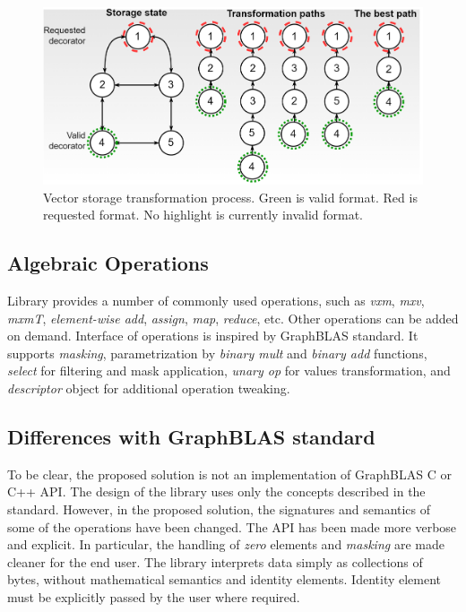 \begin{figure}[]
\centering
\includegraphics[width=0.95\linewidth]{figures/storage_transformation.png}
\caption{Vector storage transformation process. Green is valid format. Red is requested format. No highlight is currently invalid format.}
\label{fig:vec_exmp}
\end{figure}

\subsection{Algebraic Operations}

Library provides a number of commonly used operations, such as \textit{vxm}, \textit{mxv}, \textit{mxmT}, \textit{element-wise add}, \textit{assign}, \textit{map}, \textit{reduce}, etc.
Other operations can be added on demand.
Interface of operations is inspired by GraphBLAS standard. 
It supports \textit{masking}, parametrization by \textit{binary mult} and \textit{binary add} functions, \textit{select} for filtering and mask application, \textit{unary op} for values transformation, and \textit{descriptor} object for additional operation tweaking.

\subsection{Differences with GraphBLAS standard}

To be clear, the proposed solution is not an implementation of GraphBLAS C or C++ API. 
The design of the library uses only the concepts described in the standard. 
However, in the proposed solution, the signatures and semantics of some of the operations have been changed. 
The API has been made more verbose and explicit. 
In particular, the handling of \textit{zero} elements and \textit{masking} are made cleaner for the end user. The library interprets data simply as collections of bytes, without mathematical semantics and identity elements.
Identity element must be explicitly passed by the user where required.